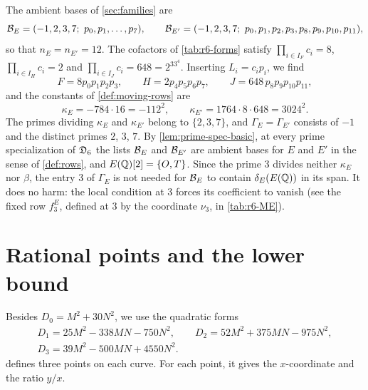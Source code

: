 The ambient bases of \cref{sec:families} are
\begin{equation}\label{r6:bases}
\cB_E=(-1,2,3,7;\ p_0,p_1,\dots,p_7),\qquad \cB_{E'}=(-1,2,3,7;\ p_0,p_1,p_2,p_3,p_8,p_9,p_{10},p_{11}),
\end{equation}
so that $n_E=n_{E'}=12$. The cofactors of \cref{tab:r6-forms} satisfy $\prod_{i\in I_F}c_i=8$, $\prod_{i\in I_H}c_i=2$ and $\prod_{i\in I_J}c_i=648=2^33^4$. Inserting $L_i=c_ip_i$, we find
\begin{equation}\label{r6:FHJ-p}
F=8p_0p_1p_2p_3,\qquad H=2p_4p_5p_6p_7,\qquad J=648\,p_8p_9p_{10}p_{11},
\end{equation}
and the constants of \cref{def:moving-rows} are
\begin{equation}\label{r6:kappa}
\kappa_E=-784\cdot16=-112^2,\qquad \kappa_{E'}=1764\cdot8\cdot648=3024^2.
\end{equation}
The primes dividing $\kappa_E$ and $\kappa_{E'}$ belong to $\{2,3,7\}$, and $\Gamma_E=\Gamma_{E'}$ consists of $-1$ and the distinct primes $2$, $3$, $7$. By \cref{lem:prime-spec-basic}, at every prime specialization of $\mathfrak D_6$ the lists $\mathcal B_E$ and $\mathcal B_{E'}$ are ambient bases for $E$ and $E'$ in the sense of \cref{def:rows}, and $E(\mathbb Q)[2]=\{O,T\}$. Since the prime $3$ divides neither $\kappa_E$ nor $\beta$, the entry $3$ of $\Gamma_E$ is not needed for $\mathcal B_E$ to contain $\delta_E(E(\mathbb Q))$ in its span. It does no harm: the local condition at $3$ forces its coefficient to vanish (see the fixed row $f^E_3$, defined at $3$ by the coordinate $\nu_3$, in \cref{tab:r6-ME}).

\section{Rational points and the lower bound}\label{sec:r6-points}

Besides $D_0=M^2+30N^2$, we use the quadratic forms
\begin{equation}\label{r6:D}
\begin{gathered}
D_1=25M^2-338MN-750N^2,\qquad D_2=52M^2+375MN-975N^2,\\
D_3=39M^2-500MN+4550N^2.
\end{gathered}
\end{equation}
 defines three points on each curve. For each point, it gives the $x$-coordinate and the ratio $y/x$.

